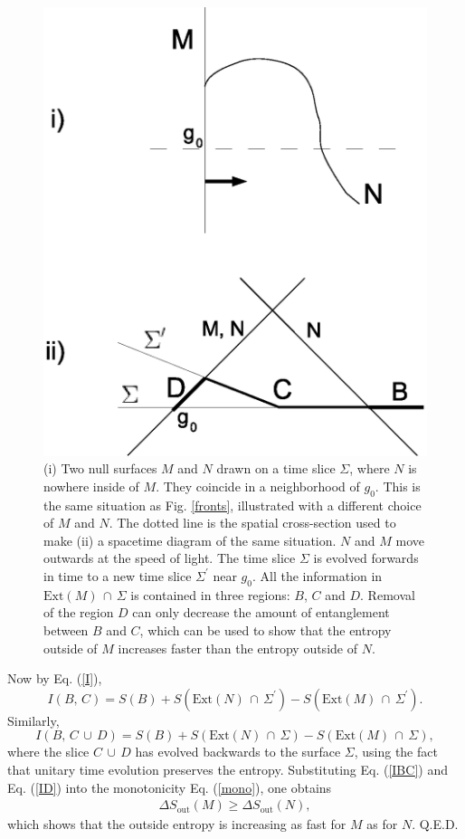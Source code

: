 \documentclass[12pt]{article}
\begin{document}
\begin{figure}[phtb]
\centering
\includegraphics[width=.8\textwidth]{lemmaC.eps}
\caption{\small{
(i) Two null surfaces $M$ and $N$ drawn on a time slice $\Sigma$, where $N$ is nowhere inside of $M$.  They coincide in a neighborhood of $g_0$.  This is the same situation as Fig. \ref{fronts}, illustrated with a different choice of $M$ and $N$.  The dotted line is the spatial cross-section used to make (ii) a spacetime diagram of the same situation.  $N$ and $M$ move outwards at the speed of light.  The time slice $\Sigma$ is evolved forwards in time to a new time slice $\Sigma^\prime$ near $g_0$.  All the information in $\mathrm{Ext}(M)\,\cap\,\Sigma$ is contained in three regions: $B$, $C$ and $D$.  Removal of the region $D$ can only decrease the amount of entanglement between $B$ and $C$, which can be used to show that the entropy outside of $M$ increases faster than the entropy outside of $N$.
}}\label{lemmaC}
\end{figure}

Now by Eq. (\ref{I}),
\begin{equation}\label{IBC}
I(B,\,C) = S(B) + S(\mathrm{Ext}(N)\,\cap\,\Sigma^\prime) - S(\mathrm{Ext}(M)\,\cap\,\Sigma^\prime).
\end{equation}
Similarly,
\begin{equation}\label{ID}
I(B,\,C\,\cup\,D) = S(B) + S(\mathrm{Ext}(N)\,\cap\,\Sigma) - S(\mathrm{Ext}(M)\,\cap\,\Sigma),
\end{equation}
where the slice $C\,\cup\,D$ has evolved backwards to the surface $\Sigma$, using the fact that unitary time evolution preserves the entropy.  Substituting Eq. (\ref{IBC}) and Eq. (\ref{ID}) into the monotonicity Eq. (\ref{mono}), one obtains
\begin{eqnarray}\label{Smono}
\Delta S_\mathrm{out}(M) \ge \Delta S_\mathrm{out}(N),
\end{eqnarray}
which shows that the outside entropy is increasing as fast for $M$ as for $N$.  Q.E.D.
\end{document}
